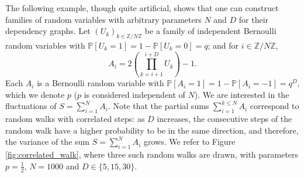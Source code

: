 \documentclass[envcountsame]{svmult}
\newcommand{\Z}{\mathbb{Z}}
\newcommand{\proba}{\mathbb{P}}
\begin{document}
\begin{example}
The following example, though quite artificial, shows that one can construct families of random variables with arbitrary parameters $N$ and $D$ for their dependency graphs. Let $(U_k)_{k \in \Z / N\Z}$ be a family of independent Bernoulli random variables with $\proba[U_k=1]=1-\proba[U_k=0]=q$; and for $i \in \Z / N\Z$,
$$A_{i} = 2\left(\prod_{k=i+1}^{i+D} U_k\right)-1.$$
Each $A_i$ is a Bernoulli random variable with $\proba[A_i=1] = 1-\proba[A_i=-1] = q^D$, which we denote $p$ ($p$ is considered independent of $N$).
We are interested in the fluctuations of $S=\sum_{i=1}^N A_i$. Note that the partial sums $\sum_{i=1}^{k \leq N}A_i$ correspond to random walks with correlated steps: as $D$ increases, the consecutive steps of the random walk have a higher probability to be in the same direction, and therefore, the variance of the sum $S = \sum_{i=1}^N A_i$ grows. We refer to Figure \ref{fig:correlated_walk}, where three such random walks are drawn, with parameters $p=\frac{1}{2}$, $N=1000$ and $D \in \{5,15,30\}$.\medskip

\begin{figure}[ht]
\begin{center}


\end{center}
\end{figure}
\end{example}
\end{document}
